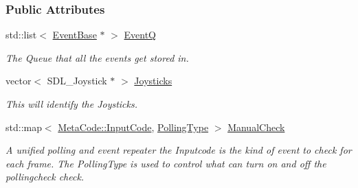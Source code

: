 \subsubsection*{Public Attributes}
\begin{DoxyCompactItemize}
\item 
\hypertarget{structMezzanine_1_1internal_1_1EventManagerInternalData_a06c1ceeb1eab29373035ac1d600c254b}{
std::list$<$ \hyperlink{classMezzanine_1_1EventBase}{EventBase} $\ast$ $>$ \hyperlink{structMezzanine_1_1internal_1_1EventManagerInternalData_a06c1ceeb1eab29373035ac1d600c254b}{EventQ}}
\label{structMezzanine_1_1internal_1_1EventManagerInternalData_a06c1ceeb1eab29373035ac1d600c254b}

\begin{DoxyCompactList}\small\item\em The Queue that all the events get stored in. \item\end{DoxyCompactList}\item 
\hypertarget{structMezzanine_1_1internal_1_1EventManagerInternalData_aa33f83018102633dbdbf41bdb0c80d5b}{
vector$<$ SDL\_\-Joystick $\ast$ $>$ \hyperlink{structMezzanine_1_1internal_1_1EventManagerInternalData_aa33f83018102633dbdbf41bdb0c80d5b}{Joysticks}}
\label{structMezzanine_1_1internal_1_1EventManagerInternalData_aa33f83018102633dbdbf41bdb0c80d5b}

\begin{DoxyCompactList}\small\item\em This will identify the Joysticks. \item\end{DoxyCompactList}\item 
\hypertarget{structMezzanine_1_1internal_1_1EventManagerInternalData_abb08d07076ca96a92742bc5d1da61856}{
std::map$<$ \hyperlink{classMezzanine_1_1MetaCode_a3b5633f0145bf3287cf53a3f05b5563c}{MetaCode::InputCode}, \hyperlink{structMezzanine_1_1internal_1_1EventManagerInternalData_a4179a167c7f67babd5aa4902dc279027}{PollingType} $>$ \hyperlink{structMezzanine_1_1internal_1_1EventManagerInternalData_abb08d07076ca96a92742bc5d1da61856}{ManualCheck}}
\label{structMezzanine_1_1internal_1_1EventManagerInternalData_abb08d07076ca96a92742bc5d1da61856}

\begin{DoxyCompactList}\small\item\em A unified polling and event repeater the Inputcode is the kind of event to check for each frame. The PollingType is used to control what can turn on and off the pollingcheck check. \item\end{DoxyCompactList}\end{DoxyCompactItemize}


